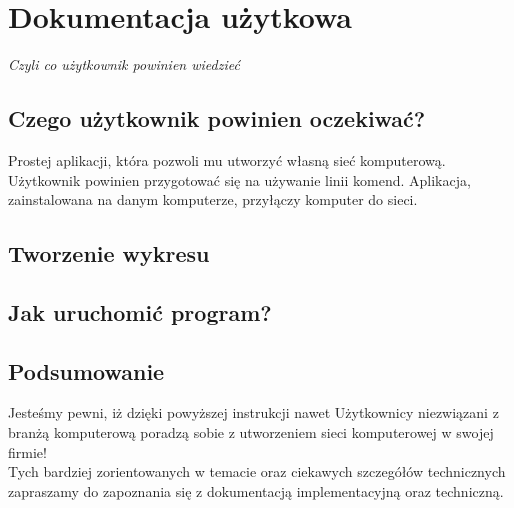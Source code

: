 \section{Dokumentacja użytkowa}

\begin{center}
\textit{Czyli co użytkownik powinien wiedzieć}
\end{center}



\subsection{Czego użytkownik powinien oczekiwać?}
Prostej aplikacji, która pozwoli mu utworzyć własną sieć komputerową. Użytkownik powinien przygotować się na używanie linii komend.
Aplikacja, zainstalowana na danym komputerze, przyłączy komputer do sieci.

\subsection{Tworzenie wykresu}

\subsection{Jak uruchomić program?}

\subsection{Podsumowanie}
Jesteśmy pewni, iż dzięki powyższej instrukcji nawet Użytkownicy niezwiązani z branżą komputerową poradzą sobie z utworzeniem sieci komputerowej w swojej firmie!\\
\indent Tych bardziej zorientowanych w temacie oraz ciekawych szczegółów technicznych zapraszamy do zapoznania się z dokumentacją implementacyjną oraz techniczną.